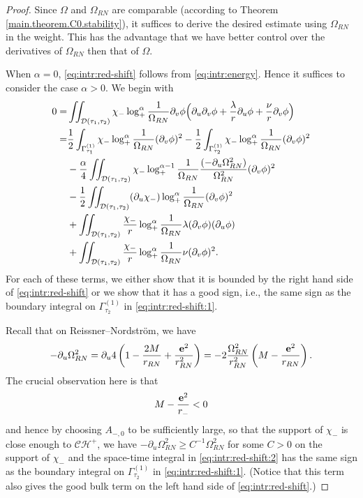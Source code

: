 \documentclass[10pt, reqno]{amsart}
\theoremstyle{definition}
\theoremstyle{remark}
\numberwithin{equation}{section}
\newcommand{\rd}{\partial}
\newcommand{\bb}{\Big}
\newcommand{\0}{\emptyset}
\newcommand{\alp}{\alpha}
\newcommand{\Gmm}{\Gamma}
\newcommand{\lmb}{\lambda}
\newcommand{\Omg}{\Omega}
\newcommand{\bfe}{{\bf e}}
\newcommand{\calC}{\mathcal C}
\newcommand{\calD}{\mathcal D}
\newcommand{\calH}{\mathcal H}
\newcommand{\dvr}{\lmb}
\newcommand{\f}{\frac}
\newcommand{\CH}{\calC \calH^{+}}		%
\begin{document}
\begin{proof} 
Since $\Omg$ and $\Omg_{RN}$ are comparable (according to Theorem \ref{main.theorem.C0.stability}), it suffices to derive the desired estimate using $\Omg_{RN}$ in the weight. This has the advantage that we have better control over the derivatives of $\Omg_{RN}$ then that of $\Omg$.

When $\alp = 0$, \eqref{eq:intr:red-shift} follows from \eqref{eq:intr:energy}. Hence it suffices to consider the case $\alp > 0$. We begin with
 \begin{align}
	0 =& \iint_{\calD(\tau_{1}, \tau_{2})} \chi_{-} \log_+^{\alp} \frac{1}{\Omg_{RN}} \rd_{v} \phi 
				\bb( \rd_{u} \rd_{v} \phi + \frac{\dvr}{r} \rd_{u} \phi + \frac{\nu}{r} \rd_{v} \phi \bb) \notag \\
	=& \frac{1}{2} \int_{\Gmm^{(1)}_{\tau_{1}}} \chi_{-} \log_+^{\alp} \frac{1}{\Omg_{RN}} (\rd_{v} \phi)^{2}
		- \frac{1}{2} \int_{\Gmm^{(1)}_{\tau_{2}}} \chi_{-} \log_+^{\alp} \frac{1}{\Omg_{RN}} (\rd_{v} \phi)^{2} \label{eq:intr:red-shift:1} \\
	& - \frac{\alp}{4} \iint_{\calD(\tau_{1}, \tau_{2})} \chi_{-} \log_+^{\alp-1} \frac{1}{\Omg_{RN}} \frac{(- \rd_{u} \Omg_{RN}^{2})}{\Omg_{RN}^{2}} (\rd_{v} \phi)^{2} \label{eq:intr:red-shift:2}\\
	&  - \frac{1}{2} \iint_{\calD(\tau_{1}, \tau_{2})} (\rd_u\chi_{-}) \log_+^{\alp} \frac{1}{\Omg_{RN}} (\rd_{v }\phi)^{2} \label{eq:intr:red-shift:3}\\
	 &  + \iint_{\calD(\tau_{1}, \tau_{2})} \f{\chi_{-}}{r} \log_+^{\alp} \frac{1}{\Omg_{RN}} \lambda(\rd_{v} \phi)(\rd_{u} \phi) \label{eq:intr:red-shift:4}\\
	&  + \iint_{\calD(\tau_{1}, \tau_{2})} \f{\chi_{-}}{r} \log_+^{\alp} \frac{1}{\Omg_{RN}} \nu(\rd_{v} \phi)^2. \label{eq:intr:red-shift:5}
\end{align}
For each of these terms, we either show that it is bounded by the right hand side of \eqref{eq:intr:red-shift} or we show that it has a good sign, i.e., the same sign as the boundary integral on $\Gamma^{(1)}_{\tau_2}$ in \eqref{eq:intr:red-shift:1}.

Recall that on Reissner--Nordstr\"om, we have
\begin{equation*}
	- \rd_{u} \Omg_{RN}^{2} = \rd_{u} 4 \left( 1- \frac{2M}{r_{RN}} + \frac{\bfe^{2}}{r_{RN}^{2}} \right)  = - 2 \frac{\Omg_{RN}^{2}}{r_{RN}^{2}} \left( M - \frac{\bfe^{2}}{r_{RN}} \right).
\end{equation*}
The crucial observation here is that
\begin{equation*}
	M - \frac{\bfe^{2}}{r_{-}} < 0
\end{equation*}
and hence by choosing $A_{-,0}$ to be sufficiently large, so that the support of $\chi_{-}$ is close enough to $\CH$, we have $- \rd_{u} \Omg_{RN}^{2} \geq C^{-1} \Omg_{RN}^{2}$ for some $C > 0$ on the support of $\chi_{-}$ and the space-time integral in \eqref{eq:intr:red-shift:2} has the same sign as the boundary integral on $\Gmm^{(1)}_{\tau_{2}}$ in \eqref{eq:intr:red-shift:1}. (Notice that this term also gives the good bulk term on the left hand side of \eqref{eq:intr:red-shift}.)


\end{proof}
\end{document}
